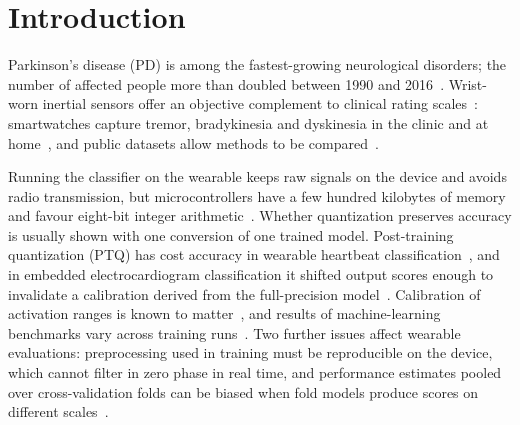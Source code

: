 \documentclass[preprint,12pt]{elsarticle}
\begin{document}
\linenumbers

\section{Introduction}
\label{sec:intro}
Parkinson's disease (PD) is among the fastest-growing neurological disorders; the number of affected people more than doubled between 1990 and 2016~\cite{GBD2018PD,Dorsey2018}. Wrist-worn inertial sensors offer an objective complement to clinical rating scales~\cite{Goetz2008,Postuma2015}: smartwatches capture tremor, bradykinesia and dyskinesia in the clinic and at home~\cite{Rovini2017,Sigcha2023rev,Powers2021,Lipsmeier2018}, and public datasets allow methods to be compared~\cite{Varghese2024,Bot2016,Monipar2023}.

Running the classifier on the wearable keeps raw signals on the device and avoids radio transmission, but microcontrollers have a few hundred kilobytes of memory and favour eight-bit integer arithmetic~\cite{David2021,Lin2020,Banbury2021,Ray2022}. Whether quantization preserves accuracy is usually shown with one conversion of one trained model. Post-training quantization (PTQ) has cost accuracy in wearable heartbeat classification~\cite{Nikandish2026}, and in embedded electrocardiogram classification it shifted output scores enough to invalidate a calibration derived from the full-precision model~\cite{ElAllam2026}. Calibration of activation ranges is known to matter~\cite{Krishnamoorthi2018,Wu2020,Nagel2021}, and results of machine-learning benchmarks vary across training runs~\cite{Bouthillier2021}. Two further issues affect wearable evaluations: preprocessing used in training must be reproducible on the device, which cannot filter in zero phase in real time, and performance estimates pooled over cross-validation folds can be biased when fold models produce scores on different scales~\cite{Forman2010,Airola2011,Fawcett2006}.
\end{document}
